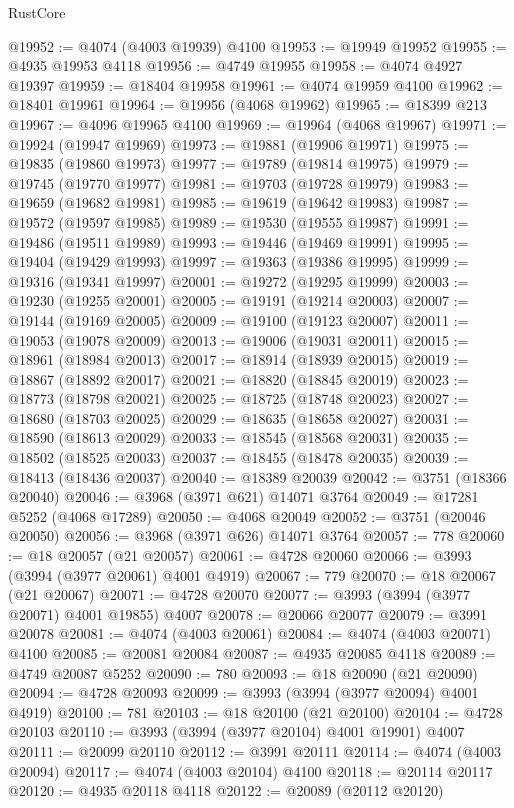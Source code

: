 \begin{lexlean}{RustCore}
\begin{coremodule}
@19952 := @4074 (@4003 @19939) @4100
@19953 := @19949 @19952
@19955 := @4935 @19953 @4118
@19956 := @4749 @19955
@19958 := @4074 @4927 @19397
@19959 := @18404 @19958
@19961 := @4074 @19959 @4100
@19962 := @18401 @19961
@19964 := @19956 (@4068 @19962)
@19965 := @18399 @213
@19967 := @4096 @19965 @4100
@19969 := @19964 (@4068 @19967)
@19971 := @19924 (@19947 @19969)
@19973 := @19881 (@19906 @19971)
@19975 := @19835 (@19860 @19973)
@19977 := @19789 (@19814 @19975)
@19979 := @19745 (@19770 @19977)
@19981 := @19703 (@19728 @19979)
@19983 := @19659 (@19682 @19981)
@19985 := @19619 (@19642 @19983)
@19987 := @19572 (@19597 @19985)
@19989 := @19530 (@19555 @19987)
@19991 := @19486 (@19511 @19989)
@19993 := @19446 (@19469 @19991)
@19995 := @19404 (@19429 @19993)
@19997 := @19363 (@19386 @19995)
@19999 := @19316 (@19341 @19997)
@20001 := @19272 (@19295 @19999)
@20003 := @19230 (@19255 @20001)
@20005 := @19191 (@19214 @20003)
@20007 := @19144 (@19169 @20005)
@20009 := @19100 (@19123 @20007)
@20011 := @19053 (@19078 @20009)
@20013 := @19006 (@19031 @20011)
@20015 := @18961 (@18984 @20013)
@20017 := @18914 (@18939 @20015)
@20019 := @18867 (@18892 @20017)
@20021 := @18820 (@18845 @20019)
@20023 := @18773 (@18798 @20021)
@20025 := @18725 (@18748 @20023)
@20027 := @18680 (@18703 @20025)
@20029 := @18635 (@18658 @20027)
@20031 := @18590 (@18613 @20029)
@20033 := @18545 (@18568 @20031)
@20035 := @18502 (@18525 @20033)
@20037 := @18455 (@18478 @20035)
@20039 := @18413 (@18436 @20037)
@20040 := @18389 @20039
@20042 := @3751 (@18366 @20040)
@20046 := @3968 (@3971 @621) @14071 @3764
@20049 := @17281 @5252 (@4068 @17289)
@20050 := @4068 @20049
@20052 := @3751 (@20046 @20050)
@20056 := @3968 (@3971 @626) @14071 @3764
@20057 := 778
@20060 := @18 @20057 (@21 @20057)
@20061 := @4728 @20060
@20066 := @3993 (@3994 (@3977 @20061) @4001 @4919)
@20067 := 779
@20070 := @18 @20067 (@21 @20067)
@20071 := @4728 @20070
@20077 := @3993 (@3994 (@3977 @20071) @4001 @19855) @4007
@20078 := @20066 @20077
@20079 := @3991 @20078
@20081 := @4074 (@4003 @20061)
@20084 := @4074 (@4003 @20071) @4100
@20085 := @20081 @20084
@20087 := @4935 @20085 @4118
@20089 := @4749 @20087 @5252
@20090 := 780
@20093 := @18 @20090 (@21 @20090)
@20094 := @4728 @20093
@20099 := @3993 (@3994 (@3977 @20094) @4001 @4919)
@20100 := 781
@20103 := @18 @20100 (@21 @20100)
@20104 := @4728 @20103
@20110 := @3993 (@3994 (@3977 @20104) @4001 @19901) @4007
@20111 := @20099 @20110
@20112 := @3991 @20111
@20114 := @4074 (@4003 @20094)
@20117 := @4074 (@4003 @20104) @4100
@20118 := @20114 @20117
@20120 := @4935 @20118 @4118
@20122 := @20089 (@20112 @20120)

\end{coremodule}
\end{lexlean}
